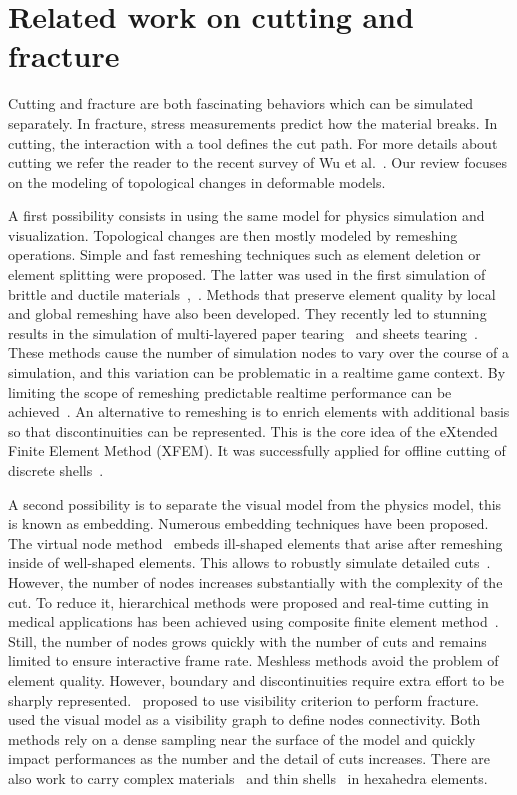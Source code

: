 \section{Related work on cutting and fracture}
\label{sec:starCutting}

Cutting and fracture are both fascinating behaviors which can be simulated separately. 
In fracture, stress measurements predict how the material breaks. 
In cutting, the interaction with a tool defines the cut path. 
For more details about cutting we refer the reader to the recent survey of Wu et al.~\cite{Wu2015}. 
Our review focuses on the modeling of topological changes in deformable models.

A first possibility consists in using the same model for physics simulation and visualization. Topological changes are then mostly modeled by remeshing operations. Simple and fast remeshing techniques such as element deletion or element splitting were proposed. The latter was used in the first simulation of brittle and ductile materials~\cite{OBrien1999},~\cite{OBrien2002}. 
 Methods that preserve element quality by local and global remeshing have also been developed. They recently led to stunning results in the simulation of multi-layered paper tearing~\cite{Busaryev2013} and sheets tearing~\cite{Pfaff2014}. 
These methods cause the number of simulation nodes to vary over the course of a simulation, and this variation can be problematic in a realtime game context.  By limiting the
scope of remeshing predictable realtime performance can be achieved~\cite{Parker2009}.
An alternative to remeshing is to enrich elements with additional basis so that discontinuities can be represented. This is the core idea of the eXtended Finite Element Method (XFEM). It was successfully applied for offline cutting of discrete shells~\cite{Kaufmann2009}.

A second possibility is to separate the visual model from the physics model, this is known as embedding. Numerous embedding techniques have been proposed. The virtual node method~\cite{Molino2004} embeds ill-shaped elements that arise after remeshing inside of well-shaped elements. This allows to robustly simulate detailed cuts~\cite{Wang2014}. However, the number of nodes increases substantially with the complexity of the cut. To reduce it, hierarchical methods were proposed and real-time cutting in medical applications has been achieved using composite finite element method~\cite{Wu2011}. Still, the number of nodes grows quickly with the number of cuts and remains limited to ensure interactive frame rate. Meshless methods avoid the problem of element quality. However, boundary and discontinuities require extra effort to be sharply represented.~\cite{Pauly2005} proposed to use visibility criterion to perform fracture.~\cite{Steinemann2009} used the visual model as a visibility graph to define nodes connectivity. Both methods rely on a dense sampling near the surface of the model and quickly impact performances as the number  and the detail of cuts increases. There are also work to carry complex materials~\cite{Nesme2009} and thin shells~\cite{Remillard2013} in hexahedra elements.

